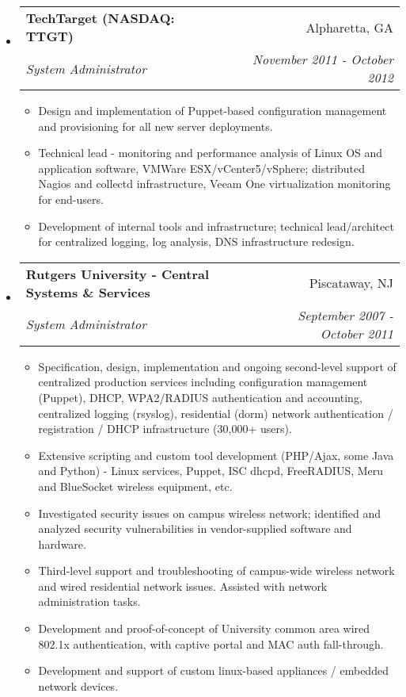 \documentclass[letterpaper,11pt]{article}
\makeatletter
\newcommand{\resitem}[1]{\item #1 \vspace{-2pt}}
\newcommand{\ressubheading}[4]{
\begin{tabular*}{7.0in}{l@{\extracolsep{\fill}}r}
		\textbf{#1} & #2 \\
		\textit{#3} & \textit{#4} \\
\end{tabular*}\vspace{-6pt}}
\makeatother
\begin{document}
\begin{itemize}
\item
	\ressubheading{TechTarget  (NASDAQ: TTGT)}{Alpharetta, GA}{System Administrator}{November 2011 - October 2012}
	\begin{itemize}
		\resitem{Design and implementation of Puppet-based configuration management and provisioning for all new server deployments.}
                \resitem{Technical lead - monitoring and performance analysis of Linux OS and application software, VMWare ESX/vCenter5/vSphere; distributed Nagios and collectd infrastructure, Veeam One virtualization monitoring for end-users.}
                \resitem{Development of internal tools and infrastructure; technical lead/architect for centralized logging, log analysis, DNS infrastructure redesign.}
	\end{itemize}
\pagebreak
\item
	\ressubheading{Rutgers University - Central Systems \&
          Services}{Piscataway, NJ}{System Administrator}{September 2007 - October 2011}
	\begin{itemize}
                \resitem{Specification, design, implementation and ongoing second-level support of centralized production services including configuration management (Puppet), DHCP, WPA2/RADIUS authentication and accounting, centralized logging (rsyslog), residential (dorm) network authentication / registration / DHCP infrastructure (30,000+ users).}
                \resitem{Extensive scripting and custom tool development
                  (PHP/Ajax, some Java and Python)
                  - Linux services, Puppet, ISC dhcpd, FreeRADIUS, Meru and BlueSocket wireless equipment, etc.}
                \resitem{Investigated security issues on campus wireless network; identified and analyzed security vulnerabilities in vendor-supplied software and hardware.}
                \resitem{Third-level support and troubleshooting of campus-wide wireless network and wired residential network issues. Assisted with network administration tasks.}
		\resitem{Development and proof-of-concept of University common area wired 802.1x authentication, with captive portal and MAC auth fall-through.}
		\resitem{Development and support of custom linux-based appliances / embedded network devices.}
	\end{itemize}

\end{itemize}
\end{document}
